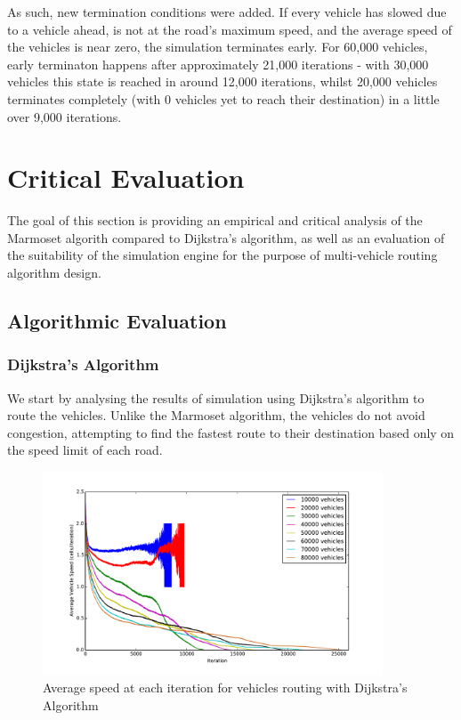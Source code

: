 \documentclass[ %
                    author={Alexander Hill},
                supervisor={Dr. Benjamin Sach},
                    degree={MEng},
                     title={MARMOSET},
                  subtitle={Multi-Agent Route Management using Online Simulation for Efficient Transportation},
                      type={research},
                      year={2016} ]{dissertation}
\begin{document}
As such, new termination conditions were added. If every vehicle has slowed due
to a vehicle ahead, is not at the road's maximum speed, and the average speed of
the vehicles is near zero, the simulation terminates early. For 60,000 vehicles,
early terminaton happens after approximately 21,000 iterations - with 30,000
vehicles this state is reached in around 12,000 iterations, whilst 20,000
vehicles terminates completely (with 0 vehicles yet to reach their destination)
in a little over 9,000 iterations.


\chapter{Critical Evaluation}
\label{chap:evaluation}

The goal of this section is providing an empirical and critical analysis of the
Marmoset algorith compared to Dijkstra's algorithm, as well as an evaluation of
the suitability of the simulation engine for the purpose of multi-vehicle
routing algorithm design.

\section{Algorithmic Evaluation}

\subsection{Dijkstra's Algorithm}\label{sec:density}

We start by analysing the results of simulation using Dijkstra's algorithm to
route the vehicles. Unlike the Marmoset algorithm, the vehicles do not avoid
congestion, attempting to find the fastest route to their destination based only
on the speed limit of each road.

\begin{figure}[h]
    \centering
    \includegraphics[width=0.9\textwidth]{dijkstra-speed}
    \caption{Average speed at each iteration for vehicles routing with
    Dijkstra's Algorithm}\label{fig:dijkstra-speed}
\end{figure}
\end{document}
